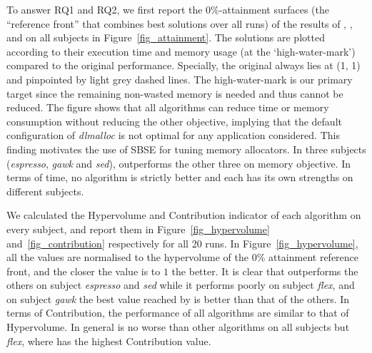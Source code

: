 To answer RQ1 and RQ2, we first report the 0\%-attainment surfaces (the ``reference front'' that combines best solutions over all runs) of the results of \sr{}, \sn{}, \dr{} and \dn{} on all subjects in Figure~\ref{fig_attainment}. The solutions are plotted according to their execution time and memory usage (at the `high-water-mark') compared to the original performance. Specially, the original always lies at (1, 1) and pinpointed by light grey dashed lines. The high-water-mark is our primary target since the remaining non-wasted memory is needed and thus cannot be reduced. 
The figure shows that all algorithms can reduce time or memory consumption without reducing the other objective, implying that the default configuration of \emph{dlmalloc} is not optimal for any application considered. This finding motivates the use of SBSE for tuning memory allocators. In three subjects (\emph{espresso}, \emph{gawk} and \emph{sed}), \dn{} outperforms the other three on memory objective. In terms of time, no algorithm is strictly better and each has its own strengths on different subjects. 

We calculated the Hypervolume and Contribution indicator of each algorithm on every subject, and report them in Figure~\ref{fig_hypervolume} and~\ref{fig_contribution} respectively for all 20 runs. 
In Figure~\ref{fig_hypervolume}, all the values are normalised to the hypervolume of the 0\% attainment reference front, and the closer the value is to $1$ the better. It is clear that \dn{} outperforms the others on subject \emph{espresso} and \emph{sed} while it performs poorly on subject \emph{flex}, and on subject \emph{gawk} the best value reached by \dn{} is better than that of the others.
In terms of Contribution, the performance of all algorithms are similar to that of Hypervolume. In general \dn{} is no worse than other algorithms on all subjects but \emph{flex}, where \sn{} has the highest Contribution value.
 
